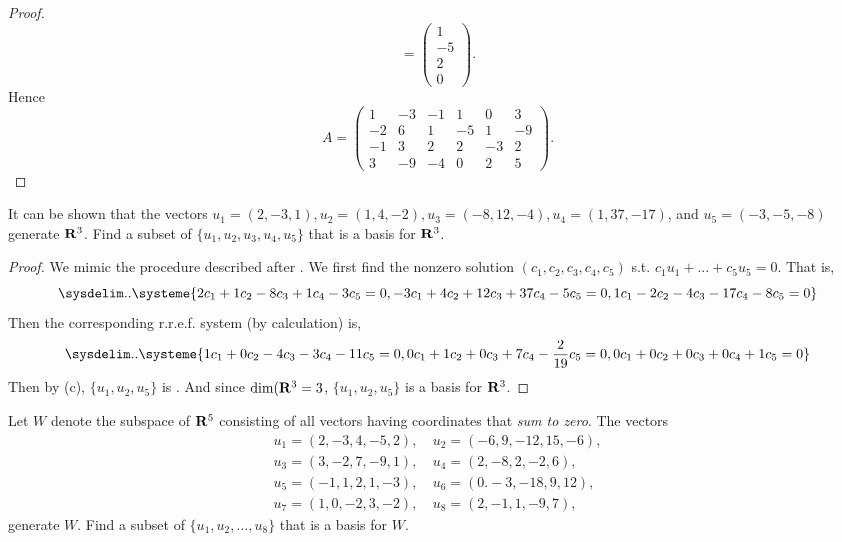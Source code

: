\begin{proof}
\[        = \begin{pmatrix} 1 \\ -5 \\ 2 \\ 0 \end{pmatrix}.
\]
Hence
\[
    A = \left(\begin{array}{cccccc}
        1 & -3 & -1 & 1 & 0 & 3 \\
        -2 & 6 & 1 & -5 & 1 & -9 \\
        -1 & 3 & 2 & 2 & -3 & 2 \\
        3 & -9 & -4 & 0 & 2 & 5
    \end{array}\right).
\]
\end{proof}

\begin{exercise} \label{exercise 3.4.7}
\sloppy It can be shown that the vectors \(u_1 = (2, -3, 1), u_2 = (1, 4, -2), u_3 = (-8, 12, -4), u_4 = (1, 37, -17)\), and \(u_5 = (-3, -5, -8)\) generate \(\mathbf{R}^3\).
Find a subset of \(\{ u_1, u_2, u_3, u_4, u_5 \}\) that is a basis for \(\mathbf{R}^3\).
\end{exercise}

\begin{proof}
We mimic the procedure described after .
We first find the nonzero solution \((c_1, c_2, c_3, c_4, c_5)\) s.t. \(c_1 u_1 + ... + c_5 u_5 = 0\).
That is,
\[
    \sysdelim..\systeme{
         2 c_1 + 1 c_2 -  8 c_3 +  1 c_4 - 3 c_5 = 0,
        -3 c_1 + 4 c_2 + 12 c_3 + 37 c_4 - 5 c_5 = 0,
         1 c_1 - 2 c_2 -  4 c_3 - 17 c_4 - 8 c_5 = 0
    }
\]
Then the corresponding r.r.e.f. system (by calculation) is,
\[
    \sysdelim..\systeme{
         1 c_1 + 0 c_2 - 4 c_3 - 3 c_4 -           11 c_5 = 0,
         0 c_1 + 1 c_2 + 0 c_3 + 7 c_4 - \frac{2}{19} c_5 = 0,
         0 c_1 + 0 c_2 + 0 c_3 + 0 c_4 +            1 c_5 = 0
    }
\]
\sloppy Then by (c), \(\{ u_1, u_2, u_5 \}\) is \LID{}.
And since \(\dim(\mathbf{R}^3 = 3\), \(\{ u_1, u_2, u_5 \}\) is a basis for \(\mathbf{R}^3\).
\end{proof}

\begin{exercise} \label{exercise 3.4.8}
Let \(W\) denote the subspace of \(\mathbf{R}^5\) consisting of all vectors having coordinates that \emph{sum to zero}.
The vectors
\begin{align*}
    u_1 = (2, -3, 4, -5, 2), &\ u_2 = (-6, 9, -12, 15, -6), \\
    u_3 = (3, -2, 7, -9, 1), &\ u_4 = (2, -8, 2, -2, 6), \\
    u_5 = (-1, 1, 2, 1, -3), &\ u_6 = (0. -3, -18, 9, 12), \\
    u_7 = (1, 0, -2, 3, -2), &\ u_8 = (2, -1, 1, -9, 7),
\end{align*}
generate \(W\).
Find a subset of \(\{ u_1, u_2, ..., u_8 \}\) that is a basis for \(W\).
\end{exercise}

